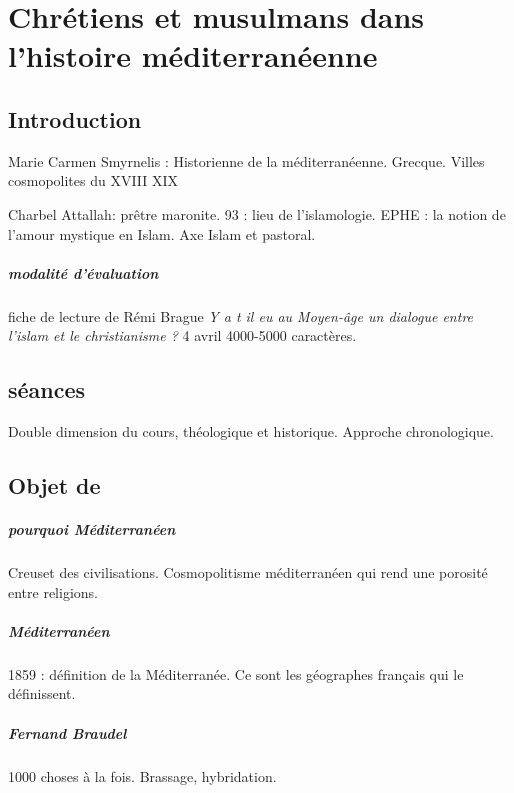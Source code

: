 \chapter{Chrétiens et musulmans dans l'histoire méditerranéenne}


\section{Introduction}

Marie Carmen Smyrnelis : Historienne de la méditerranéenne. Grecque. Villes cosmopolites du XVIII XIX

Charbel Attallah: prêtre maronite. 93 : lieu de l'islamologie. EPHE : la notion de l'amour mystique en Islam. Axe Islam et pastoral. 


\paragraph{modalité d'évaluation} fiche de lecture de Rémi Brague \textit{Y a t il eu au Moyen-âge un dialogue entre l'islam et le christianisme ?} 4 avril 4000-5000 caractères. 

\section{séances}
Double dimension du cours, théologique et historique.
Approche chronologique. 


\section{Objet de \Med}
\paragraph{pourquoi Méditerranéen} Creuset des civilisations. Cosmopolitisme méditerranéen qui rend une porosité entre religions.

\paragraph{Méditerranéen} 1859 : définition de la Méditerranée. Ce sont les géographes français qui le définissent. 
\paragraph{Fernand Braudel} 1000 choses à la fois. Brassage, hybridation. 

